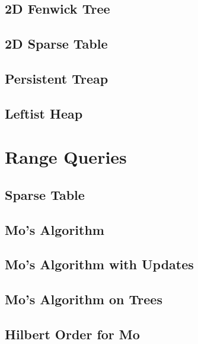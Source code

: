 \documentclass[10pt,letterpaper,landscape,twocolumn]{article}
\begin{document}
\subsection{2D Fenwick Tree}

\subsection{2D Sparse Table}

\subsection{Persistent Treap}

\subsection{Leftist Heap}


\section{Range Queries}
\subsection{Sparse Table}

\subsection{Mo's Algorithm}


\subsection{Mo's Algorithm with Updates}

\subsection{Mo's Algorithm on Trees}

\subsection{Hilbert Order for Mo}

\end{document}
